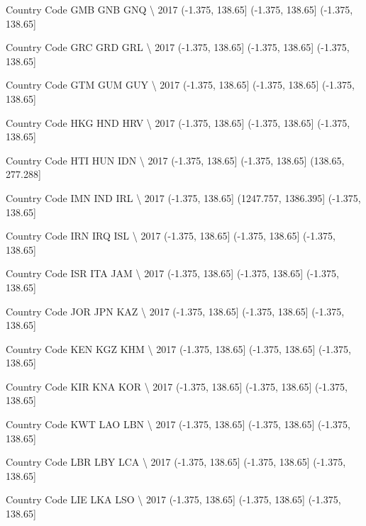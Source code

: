 \documentclass[11pt]{article}
\begin{document}
Country Code               GMB               GNB               GNQ  \textbackslash{}
2017          (-1.375, 138.65]  (-1.375, 138.65]  (-1.375, 138.65]   

Country Code               GRC               GRD               GRL  \textbackslash{}
2017          (-1.375, 138.65]  (-1.375, 138.65]  (-1.375, 138.65]   

Country Code               GTM               GUM               GUY  \textbackslash{}
2017          (-1.375, 138.65]  (-1.375, 138.65]  (-1.375, 138.65]   

Country Code               HKG               HND               HRV  \textbackslash{}
2017          (-1.375, 138.65]  (-1.375, 138.65]  (-1.375, 138.65]   

Country Code               HTI               HUN                IDN  \textbackslash{}
2017          (-1.375, 138.65]  (-1.375, 138.65]  (138.65, 277.288]   

Country Code               IMN                   IND               IRL  \textbackslash{}
2017          (-1.375, 138.65]  (1247.757, 1386.395]  (-1.375, 138.65]   

Country Code               IRN               IRQ               ISL  \textbackslash{}
2017          (-1.375, 138.65]  (-1.375, 138.65]  (-1.375, 138.65]   

Country Code               ISR               ITA               JAM  \textbackslash{}
2017          (-1.375, 138.65]  (-1.375, 138.65]  (-1.375, 138.65]   

Country Code               JOR               JPN               KAZ  \textbackslash{}
2017          (-1.375, 138.65]  (-1.375, 138.65]  (-1.375, 138.65]   

Country Code               KEN               KGZ               KHM  \textbackslash{}
2017          (-1.375, 138.65]  (-1.375, 138.65]  (-1.375, 138.65]   

Country Code               KIR               KNA               KOR  \textbackslash{}
2017          (-1.375, 138.65]  (-1.375, 138.65]  (-1.375, 138.65]   

Country Code               KWT               LAO               LBN  \textbackslash{}
2017          (-1.375, 138.65]  (-1.375, 138.65]  (-1.375, 138.65]   

Country Code               LBR               LBY               LCA  \textbackslash{}
2017          (-1.375, 138.65]  (-1.375, 138.65]  (-1.375, 138.65]   

Country Code               LIE               LKA               LSO  \textbackslash{}
2017          (-1.375, 138.65]  (-1.375, 138.65]  (-1.375, 138.65]   
\end{document}
